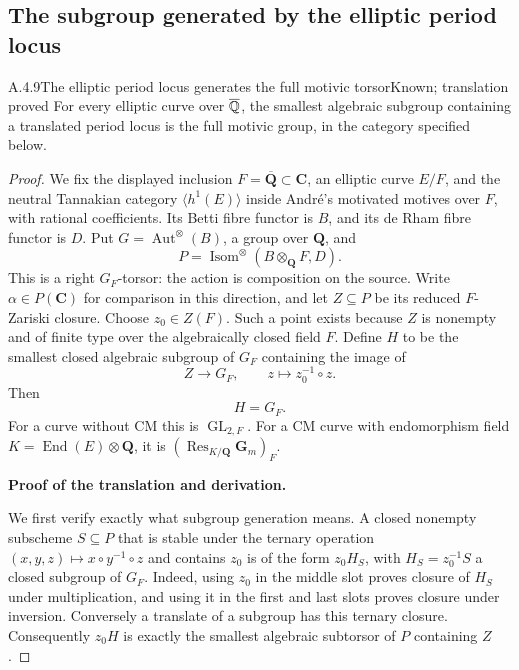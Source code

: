 \subsection{The subgroup generated by the elliptic period locus}

\begin{result}{A.4.9}{The elliptic period locus generates the full motivic torsor}{Known; translation proved}
For every elliptic curve over $\overline{\mathbb Q}$, the smallest algebraic subgroup containing a translated period locus is the full motivic group, in the category specified below.
\end{result}
\begin{proof}
We fix the displayed inclusion \(F=\overline{\mathbf Q}\subset\mathbf C\),
an elliptic curve \(E/F\), and the neutral Tannakian category \(\langle
h^1(E)\rangle\) inside André's motivated motives over \(F\), with rational
coefficients. Its Betti fibre functor is \(B\), and its de Rham fibre functor
is \(D\). Put \(G=\operatorname{Aut}^{\otimes}(B)\), a group over
\(\mathbf Q\), and
\[
P=\operatorname{Isom}^{\otimes}(B\otimes_{\mathbf Q}F,D).
\]
This is a right \(G_F\)-torsor: the action is composition on the source.
Write \(\alpha\in P(\mathbf C)\) for comparison in this direction, and let
\(Z\subseteq P\) be its reduced \(F\)-Zariski closure. Choose
\(z_0\in Z(F)\). Such a point exists because \(Z\) is nonempty and of
finite type over the algebraically closed field \(F\). Define \(H\) to be
the smallest closed algebraic subgroup of \(G_F\) containing the image of
\[
 Z\longrightarrow G_F,\qquad z\longmapsto z_0^{-1}\circ z.
\]
Then
\[
H=G_F.
\]
For a curve without CM this is \(\operatorname{GL}_{2,F}\). For a CM curve
with endomorphism field \(K=\operatorname{End}(E)\otimes\mathbf Q\), it is
\((\operatorname{Res}_{K/\mathbf Q}\mathbf G_m)_F\).

\textbf{Proof of the translation and derivation.}

We first verify exactly what subgroup generation means. A closed nonempty
subscheme \(S\subseteq P\) that is stable under the ternary operation
\((x,y,z)\mapsto x\circ y^{-1}\circ z\) and contains \(z_0\) is of the
form \(z_0H_S\), with \(H_S=z_0^{-1}S\) a closed subgroup of \(G_F\).
Indeed, using \(z_0\) in the middle slot proves closure of \(H_S\) under
multiplication, and using it in the first and last slots proves closure
under inversion. Conversely a translate of a subgroup has this ternary
closure. Consequently \(z_0H\) is exactly the smallest algebraic subtorsor
of \(P\) containing \(Z\).


\end{proof}
